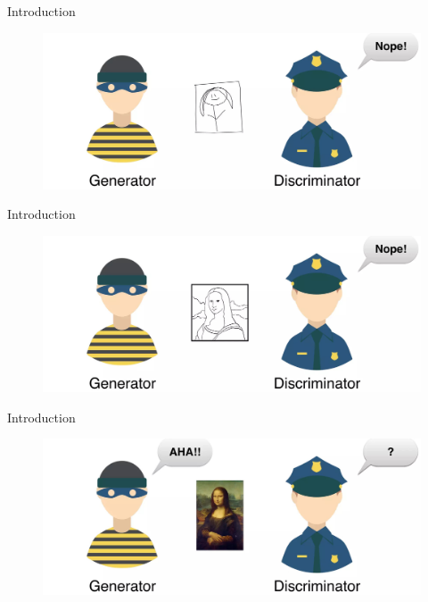 \documentclass{beamer}
\begin{document}
\begin{frame}{Introduction} 
    \begin{figure}[h]
        \centering
        \includegraphics[width=1.0\textwidth]{slide_07.jpg} %
        \captionsetup{labelformat=empty}
    \end{figure}
    
\end{frame}

\begin{frame}{Introduction} 
    \begin{figure}[h]
        \centering
        \includegraphics[width=1.0\textwidth]{slide_08.jpg} %
        \captionsetup{labelformat=empty}
    \end{figure}
    
\end{frame}

\begin{frame}{Introduction} 
    \begin{figure}[h]
        \centering
        \includegraphics[width=1.0\textwidth]{slide_10.jpg} %
        \captionsetup{labelformat=empty}
    \end{figure}
\end{frame}
\end{document}
